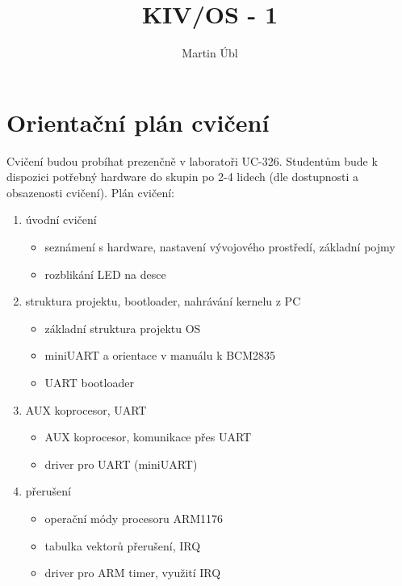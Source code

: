 \documentclass{article}
\author{Martin Úbl}
\title{KIV/OS - \lang{cvičení č.}{course no.} 1}
\newcommand\lang[2]{#1}
\begin{document}
\maketitle

\section{\lang{Orientační plán cvičení}{Course schedule}}

\lang{Cvičení budou probíhat prezenčně v laboratoři UC-326. Studentům bude k dispozici potřebný hardware do skupin po 2-4 lidech (dle dostupnosti a obsazenosti cvičení). Plán cvičení:}{Courses will be done in UC-326 lab. Students will be provided with needed hardware to groups of 2-4 people.}

\begin{enumerate}
	\item \lang{úvodní cvičení}{initial course}
	\begin{itemize}
		\item \lang{seznámení s hardware, nastavení vývojového prostředí, základní pojmy}{getting to know the hardware, environment setup, basic terms}
		\item \lang{rozblikání LED na desce}{blinking the onboard LED}
	\end{itemize}

	\item \lang{struktura projektu, bootloader, nahrávání kernelu z PC}{project structure, bootloader, host loader}
	\begin{itemize}
		\item \lang{základní struktura projektu OS}{basic structure of OS project}
		\item \lang{miniUART a orientace v manuálu k BCM2835}{miniUART, reading the BCM2835 manual}
		\item UART bootloader
	\end{itemize}

	\item AUX \lang{koprocesor}{coprocessor}, UART
	\begin{itemize}
		\item \lang{AUX koprocesor, komunikace přes UART}{AUX coprocessor, UART communication}
		\item \lang{driver pro}{driver for} UART (miniUART)
	\end{itemize}

	\item \lang{přerušení}{interrupts}
	\begin{itemize}
		\item \lang{operační módy procesoru}{operating modes of} ARM1176
		\item \lang{tabulka vektorů přerušení}{interrupt vector table}, IRQ
		\item driver \lang{pro}{for} ARM timer, \lang{využití}{using} IRQ
	\end{itemize}


\end{enumerate}
\end{document}
